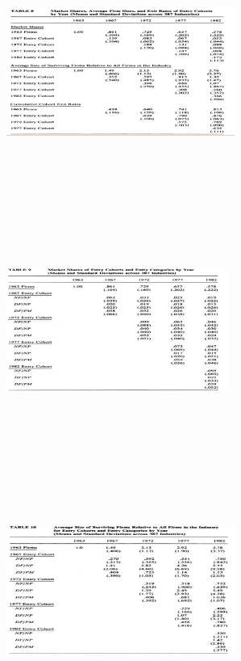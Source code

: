 \documentclass[dvipdfmx,12pt]{beamer}
\begin{document}
\begin{frame}

\begin{center}

\includegraphics[width=7.5cm,height=8cm]{DRS_T8.pdf}

\end{center}

\end{frame}

\begin{frame}

\begin{center}

\includegraphics[width=7.25cm,height=8cm]{DRS_T9.pdf}

\end{center}

\end{frame}

\begin{frame}

\begin{center}

\includegraphics[width=7.5cm,height=8cm]{DRS_T10.pdf}

\end{center}

\end{frame}
\end{document}
